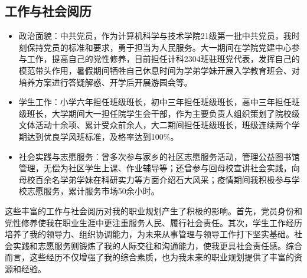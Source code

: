 \documentclass{article}
\begin{document}
\subsection{工作与社会阅历}
\begin{itemize}
	
\item 政治面貌：中共党员，作为计算机科学与技术学院21级第一批中共党员，我时刻保持党员的标准和要求，勇于担当为人民服务。大一期间在学院党建中心参与工作，提高自己的党性修养，目前担任计科2304班驻班党代表，发挥自己的模范带头作用，暑假期间牺牲自己休息时间为学弟学妹开展入学教育班会、对培养方案进行答疑解惑、开学后开展游园会等。\par
\item 学生工作：小学六年担任班级班长，初中三年担任班级班长，高中三年担任班级班长，大学期间大一担任院学生会干部，作为主要负责人组织策划了院校级文体活动十余项、累计受众前余人，大二期间担任班级班长，班级连续两个学期达到优良学风班标准，及格率达到100\%。\par
\item 社会实践与志愿服务：曾多次参与家乡的社区志愿服务活动，管理公益图书馆管理，无偿为社区学生上课、作业辅导等；还曾参与回母校宣讲社会实践，向母校百余名学弟学妹在科研实力等方面介绍石大风采；疫情期间我积极参与学校志愿服务，累计服务市场50余小时。\par
 
\end{itemize}
\par 这些丰富的工作与社会阅历对我的职业规划产生了积极的影响。首先，党员身份和党性修养使我在职业生涯中更注重服务人民、履行社会责任。其次，学生工作经历培养了我的领导力、组织协调能力，为未来从事管理与领导工作打下坚实基础。社会实践和志愿服务则锻炼了我的人际交往和沟通能力，使我更具社会责任感。综合而言，这些经历不仅增强了我的综合素质，也为我未来的职业规划提供了丰富的资源和经验。
\end{document}
